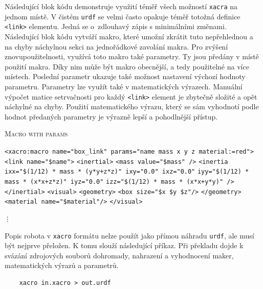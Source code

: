 Následující blok kódu demonstruje využití téměř všech možností \verb|xacra| na jednom místě.
V čistém \verb|urdf| se velmi často opakuje téměř totožná definice \verb|<link>| elementu. Jedná se o~zdlouhavý zápis s minimálními změnami. Následující blok kódu vytváří makro, které umožní zkrátit tuto nepřehlednou a na chyby náchylnou sekci na jednořádkové zavolání makra. Pro zvýšení znovupoužitelnosti, využívá toto makro také parametry. Ty jsou předány v místě použití makra. Díky nim může být makro obecnější, a tedy použitelné na více místech. Poslední parametr ukazuje také možnost nastavení výchozí hodnoty parametru. Parametry lze využít také v matematických výrazech. Manuální výpočet matice setrvačnosti pro každý \verb|<link>| element je zbytečně složité a opět náchylné na chyby. Použití matematického výrazu, který se sám vyhodnotí podle hodnot předaných parametry je výrazně lepší a pohodlnější přístup.

\begin{algorithm}[h!]
	\label{}
	\caption{\textsc{Macro with params}}
	
	\DontPrintSemicolon
	\SetAlgoNoLine
	\SetNlSty{}{}{:}
	\SetNlSkip{-1.1em}
	
	\BlankLine \Indp\Indpp
	
	\texttt{<xacro:macro name="box\_link" params="name mass x y z material:=red">}\;
	\Indp\Indp
	\texttt{<link name="\${name}">}\;
	\Indp\Indp
	\texttt{<inertial>}\;
	\Indp\Indp
	\texttt{<mass value="\${mass}" />}\;
	\texttt{<inertia ixx="\${(1/12) * mass * (y*y+z*z)}" ixy="0.0" ixz="0.0"}\;
	\Indp\Indp
	\texttt{\hspace{2.6em}iyy="\${(1/12) * mass * (x*x+z*z)}" iyz="0.0"}\;
	\texttt{\hspace{2.6em}izz="\${(1/12) * mass * (x*x+y*y)}" />}\;
	\Indm\Indm
	\Indm\Indm
	\texttt{</inertial>}\;
	\texttt{<visual>}\;
	\Indp\Indp
	\texttt{<geometry>}\;	
	\Indp\Indp
	\texttt{<box size="\${x} \${y} \${z}"/>}\;
	\Indm\Indm
	\texttt{</geometry>}\;
	\texttt{<material name="\${material}"/>}\;
	\Indm\Indm
	\texttt{</visual>}\;
    \begin{center}
	\texttt{\vdots}
	\end{center}
	
\end{algorithm}

Popis robota v \verb|xacro| formátu nelze použít jako přímou náhradu \verb|urdf|, ale musí být nejprve přeložen. K tomu slouží následující příkaz. Při překladu dojde k svázání zdrojových souborů dohromady, nahrazení a vyhodnocení maker, matematických výrazů a parametrů.
\begin{verbatim}
	xacro in.xacro > out.urdf
\end{verbatim}


